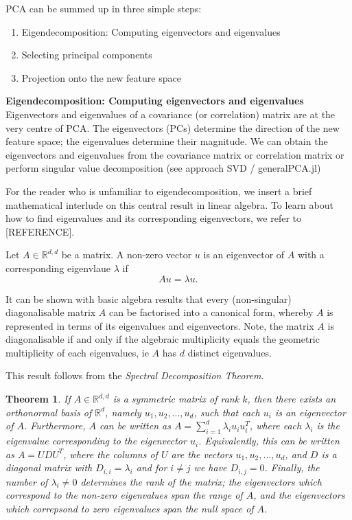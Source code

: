 \documentclass[journal, a4paper]{IEEEtran}
\newtheorem{theorem}{Theorem}[section]
\begin{document}
PCA can be summed up in three simple steps:
\begin{enumerate}
	\item Eigendecomposition: Computing eigenvectors and eigenvalues
	\item Selecting principal components
	\item Projection onto the new feature space
\end{enumerate}
\newline
\textbf{Eigendecomposition: Computing eigenvectors and eigenvalues}\\
Eigenvectors and eigenvalues of a covariance (or correlation) matrix are at the very centre of PCA. The eigenvectors (PCs) determine the direction of the new feature space; the eigenvalues determine their magnitude. 
We can obtain the eigenvectors and eigenvalues from the covariance matrix or correlation matrix or perform singular value decomposition (see approach SVD / generalPCA.jl)

For the reader who is unfamiliar to eigendecomposition, we insert a brief mathematical interlude on this central result in linear algebra. To learn about how to find eigenvalues and its corresponding eigenvectors, we refer to [REFERENCE].

Let \( A \in \mathbb{R}^{d,d}\) be a matrix. A non-zero vector \( u \) is an eigenvector of \( A \) with a corresponding eigenvlaue \( \lambda \) if 
\begin{equation}
	A u = \lambda u .
\end{equation}

It can be shown with basic algebra results that every (non-singular) diagonalisable matrix \( A \) can be factorised into a canonical form, whereby \( A \) is represented in terms of its eigenvalues and eigenvectors.
Note, the matrix \( A \) is diagonalisable if and only if the algebraic multiplicity equals the geometric multiplicity of each eigenvalues, ie \( A \) has \( d \) distinct eigenvalues.

This result follows from the \textit{Spectral Decomposition Theorem}. 
\begin{theorem}\label{spectralthm}
	If \( A \in \mathbb{R}^{d,d}\) is a symmetric matrix of rank \( k \), then there exists an orthonormal basis of \( \mathbb{R}^d \), namely \( u_{1}, u_{2}, ..., u_{d} \), such that each \( u_{i} \) is an eigenvector of \( A \). Furthermore, \( A \) can be written as \( A = \sum_{i=1}^{d} \lambda_{i} u_{i} u_{i}^T \), where each \( \lambda_{i} \) is the eigenvalue corresponding to the eigenvector \( u_{i} \). Equivalently, this can be written as \( A = U D U^T \), where the columns of \( U \) are the vectors \( u_{1}, u_{2}, ..., u_{d} \), and \( D \) is a diagonal matrix with \( D_{i,i} = \lambda_{i} \) and for \( i \neq j \) we have \( D_{i,j} = 0 \). Finally, the number of \( \lambda_{i} \neq 0 \) determines the rank of the matrix; the eigenvectors which correspond to the non-zero eigenvalues span the range of \( A \), and the eigenvectors which correpsond to zero eigenvalues span the null space of \( A \).
\end{theorem}
\end{document}
